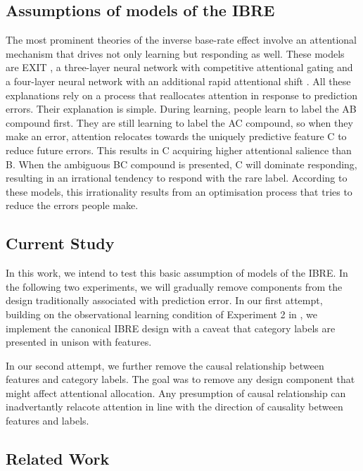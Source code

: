 \documentclass[10pt,letterpaper]{article}
\begin{document}
\subsection*{Assumptions of models of the IBRE}

The most prominent theories of the inverse base-rate effect involve an attentional mechanism that drives not only learning but responding as well.
These models are EXIT \cite{kruschke2001toward}, a three-layer neural network with competitive attentional gating and a four-layer neural network with an additional rapid attentional shift \cite{paskewitz2020dissecting}.
All these explanations rely on a process that reallocates attention in response to prediction errors.
Their explanation is simple.
During learning, people learn to label the AB compound first.
They are still learning to label the AC compound, so when they make an error, attention relocates towards the uniquely predictive feature C to reduce future errors.
This results in C acquiring higher attentional salience than B.
When the ambiguous BC compound is presented, C will dominate responding, resulting in an irrational tendency to respond with the rare label.
According to these models, this irrationality results from an optimisation process that tries to reduce the errors people make.

\subsection*{Current Study}

In this work, we intend to test this basic assumption of models of the IBRE.
In the following two experiments, we will gradually remove components from the design traditionally associated with prediction error.
In our first attempt, building on the observational learning condition of Experiment 2 in , we implement the canonical IBRE design with a caveat that category labels are presented in unison with features.

In our second attempt, we further remove the causal relationship between features and category labels.
The goal was to remove any design component that might affect attentional allocation.
Any presumption of causal relationship can inadvertantly relacote attention in line with the direction of causality between features and labels.

\subsection*{Related Work}
\end{document}
